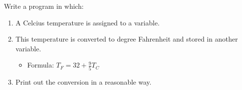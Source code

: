 Write a program in which:
\begin{enumerate}
  \item A Celcius temperature is assigned to a variable.
  \item This temperature is converted to degree Fahrenheit and stored in another variable.
    \begin{itemize}
      \item Formula: $T_F = 32+\frac{9}{5} T_C$
    \end{itemize}
  \item Print out the conversion in a reasonable way.
\end{enumerate}
